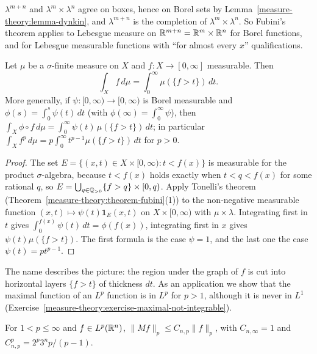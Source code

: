 \begin{remark}\label{measure-theory:remark-lebesgue-product}
$\lambda^{m+n}$ and $\lambda^m \times \lambda^n$ agree on boxes, hence on Borel sets by Lemma~\ref{measure-theory:lemma-dynkin}, and $\lambda^{m+n}$ is the completion of $\lambda^m \times \lambda^n$. So
Fubini's theorem applies to Lebesgue measure on $\mathbb{R}^{m+n} = \mathbb{R}^m \times \mathbb{R}^n$ for Borel functions, and for Lebesgue measurable functions with ``for almost every $x$'' qualifications.
\end{remark}

\begin{proposition}\label{measure-theory:proposition-layer-cake}
Let $\mu$ be a $\sigma$-finite measure on $X$ and $f \colon X \to [0, \infty]$ measurable. Then
\[
\int_Xf\,d\mu = \int_0^\infty\mu(\{f > t\})\,dt.
\]
More generally, if $\psi \colon [0, \infty) \to [0, \infty)$ is Borel measurable and $\phi(s) = \int_0^s\psi(t)\,dt$ (with $\phi(\infty) = \int_0^\infty\psi$), then
$\int_X\phi \circ f\,d\mu = \int_0^\infty\psi(t)\,\mu(\{f > t\})\,dt$; in particular $\int_Xf^p\,d\mu = p\int_0^\infty t^{p-1}\mu(\{f > t\})\,dt$ for $p > 0$.
\end{proposition}

\begin{proof}
The set $E = \{(x, t) \in X \times [0, \infty) : t < f(x)\}$ is measurable for the product $\sigma$-algebra, because $t < f(x)$ holds exactly when $t < q < f(x)$ for some rational
$q$, so $E = \bigcup_{q \in \mathbb{Q}_{>0}}\{f > q\} \times [0, q)$. Apply Tonelli's theorem (Theorem~\ref{measure-theory:theorem-fubini}(1)) to the non-negative measurable function
$(x, t) \mapsto \psi(t)\mathbf{1}_E(x, t)$ on $X \times [0, \infty)$ with $\mu \times \lambda$. Integrating first in $t$ gives $\int_0^{f(x)}\psi(t)\,dt = \phi(f(x))$, integrating first in
$x$ gives $\psi(t)\mu(\{f > t\})$. The first formula is the case $\psi = 1$, and the last one the case $\psi(t) = pt^{p-1}$.
\end{proof}

The name describes the picture: the region under the graph of $f$ is cut into horizontal layers $\{f > t\}$ of thickness $dt$. As an application we show that the maximal
function of an $L^p$ function is in $L^p$ for $p > 1$, although it is never in $L^1$ (Exercise~\ref{measure-theory:exercise-maximal-not-integrable}).

\begin{corollary}\label{measure-theory:corollary-maximal-lp}
For $1 < p \leq \infty$ and $f \in L^p(\mathbb{R}^n)$, $\|Mf\|_p \leq C_{n,p}\|f\|_p$, with $C_{n,\infty} = 1$ and $C_{n,p}^p = 2^p3^np/(p - 1)$.
\end{corollary}

